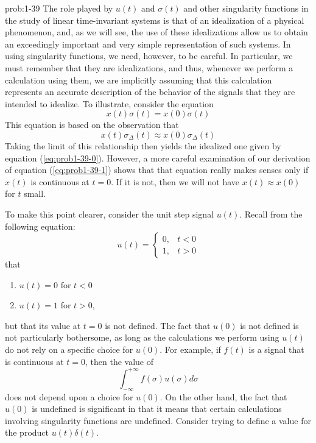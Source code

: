 \documentclass[koma,a4paper,utopia,12pt,listings-color,microtype,paralist,colorlinks,urlcolor=red]{org-article}
\begin{document}
\begin{prob}[]{prob:1-39}
The role played by \(u(t)\) and \(\sigma(t)\) and other singularity
functions in the study of linear time-invariant systems is that of an
idealization of a physical phenomenon, and, as we will see, the use of these
idealizations allow us to obtain an exceedingly important and very simple
representation of such systems. In using singularity functions, we need,
however, to be careful. In particular, we must remember that they are
idealizations, and thus, whenever we perform a calculation using them, we
are implicitly assuming that this calculation represents an accurate
description of the behavior of the signals that they are intended to
idealize. To illustrate, consider the equation
\begin{equation}
\label{eq:prob1-39-0}
x(t)\sigma(t) = x(0)\sigma(t)
\end{equation}
This equation is based on the observation that
\begin{equation}
\label{eq:prob1-39-1}
x(t)\sigma_{\Delta}(t) \approx x(0)\sigma_{\Delta}(t)
\end{equation}
Taking the limit of this relationship then yields the idealized one given by
equation (\ref{eq:prob1-39-0}). However, a more careful examination of our
derivation of equation (\ref{eq:prob1-39-1}) shows that that equation really
makes senses only if \(x(t)\) is continuous at \(t=0\). If it is not, then
we will not have \(x(t)\approx x(0)\)  for \(t\) small.

To make this point clearer, consider the unit step signal \(u(t)\). Recall
from the following equation:
\begin{equation*}
u(t) =
\begin{cases}
  0, & t< 0\\
  1, & t> 0
\end{cases}
\end{equation*}
that

\begin{enumerate}
\item \(u(t)= 0\) for \(t<0\)
\item \(u(t) = 1\) for \(t> 0\),
\end{enumerate}

but that its value at \(t=0\) is not defined. The fact that \(u(0)\) is not
defined is not particularly bothersome, as long as the calculations we
perform using \(u(t)\) do not rely on a specific choice for \(u(0)\). For
example, if \(f(t)\) is a signal that is continuous at \(t=0\), then the
value of
\begin{equation*}
\int_{-\infty}^{+\infty} f(\sigma) u(\sigma) d \sigma
\end{equation*}
does not depend upon a choice for \(u(0)\). On the other hand, the fact that
\(u(0)\) is undefined is significant in that it means that certain
calculations involving singularity functions are undefined. Consider trying
to define a value for the product \(u(t)\delta(t)\).


\end{prob}
\end{document}
